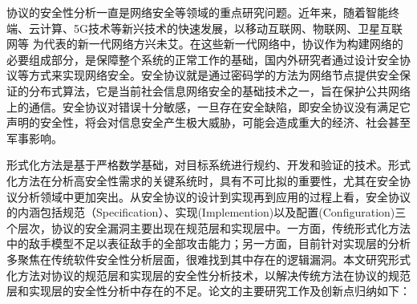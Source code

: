 


\begin{cabstract}

协议的安全性分析一直是网络安全等领域的重点研究问题。近年来，随着智能终端、云计算、5G技术等新兴技术的快速发展，以移动互联网、物联网、卫星互联网等
为代表的新一代网络方兴未艾。在这些新一代网络中，协议作为构建网络的必要组成部分，是保障整个系统的正常工作的基础，国内外研究者通过设计安全协议等方式来实现网络安全。安全协议就是通过密码学的方法为网络节点提供安全保证的分布式算法，它是当前社会信息网络安全的基础技术之一，旨在保护公共网络上的通信。安全协议对错误十分敏感，一旦存在安全缺陷，即安全协议没有满足它声明的安全性，将会对信息安全产生极大威胁，可能会造成重大的经济、社会甚至军事影响。

形式化方法是基于严格数学基础，对目标系统进行规约、开发和验证的技术。形式化方法在分析高安全性需求的关键系统时，具有不可比拟的重要性，尤其在安全协议分析领域中更加突出。从安全协议的设计到实现再到应用的过程上看，安全协议的内涵包括规范（Specification）、实现(Implemention)以及配置(Configuration)三个层次，协议的安全漏洞主要出现在规范层和实现层中。一方面，传统形式化方法中的敌手模型不足以表征敌手的全部攻击能力；另一方面，目前针对实现层的分析多聚焦在传统软件安全性分析层面，很难找到其中存在的逻辑漏洞。本文研究形式化方法对协议的规范层和实现层的安全性分析技术，以解决传统方法在协议的规范层和实现层的安全性分析中存在的不足。论文的主要研究工作及创新点归纳如下：







\end{cabstract}
